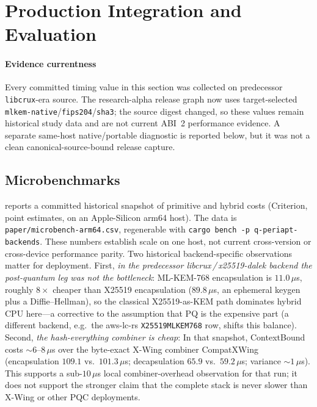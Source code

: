 \documentclass[journal]{IEEEtran}
\newcommand{\code}[1]{\texttt{\small #1}}
\begin{document}
\section{Production Integration and Evaluation}\label{sec:eval}

\paragraph*{Evidence currentness}
Every committed timing value in this section was collected on predecessor
\code{libcrux}-era source. The research-alpha release graph now uses target-selected
\code{mlkem-native}/\code{fips204}/\code{sha3}; the source digest changed, so these
values remain historical study data and are not current ABI~2 performance evidence.
A separate same-host native/portable diagnostic is reported below, but it was not a
clean canonical-source-bound release capture.

\subsection{Microbenchmarks}
 reports a committed historical snapshot of primitive and hybrid costs (Criterion,
point estimates, on an Apple-Silicon arm64 host). The data is
\code{paper/microbench-arm64.csv}, regenerable with \code{cargo bench -p q-periapt-backends}. These
numbers establish scale on one host, not current cross-version or cross-device performance parity. Two
historical backend-specific observations matter for deployment. First, \emph{in the predecessor
libcrux\,/\,x25519-dalek backend the post-quantum leg was not the bottleneck}:
ML-KEM-768 encapsulation is $11.0\,\mu$s, roughly $8\times$ cheaper than X25519 encapsulation
($89.8\,\mu$s, an ephemeral keygen plus a Diffie--Hellman), so the classical X25519-as-KEM path
dominates hybrid CPU here---a corrective to the assumption that PQ is the expensive part (a different
backend, e.g.\ the aws-lc-rs \code{X25519MLKEM768} row, shifts this balance). Second, \emph{the hash-everything combiner is cheap}:
In that snapshot, ContextBound costs $\sim 6$--$8\,\mu$s over the byte-exact X-Wing combiner CompatXWing
(encapsulation $109.1$ vs.\ $101.3\,\mu$s; decapsulation $65.9$ vs.\ $59.2\,\mu$s; variance
$\sim 1\,\mu$s). This supports a sub-$10\,\mu$s local combiner-overhead observation for that run;
it does not support the stronger claim that the complete stack is never slower than X-Wing or other
PQC deployments.
\end{document}

